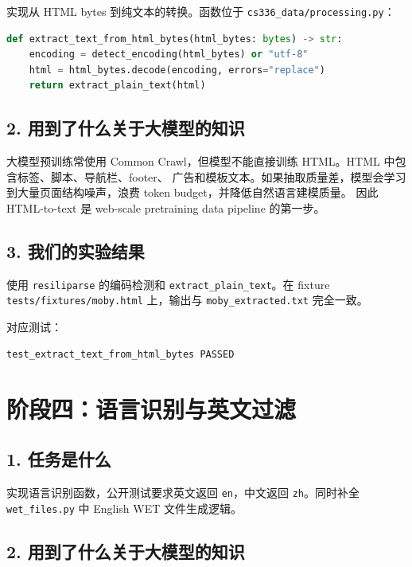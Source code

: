 \documentclass[UTF8,11pt]{ctexart}
\begin{document}
实现从 HTML bytes 到纯文本的转换。函数位于 \texttt{cs336\_data/processing.py}：

\begin{lstlisting}[language=Python]
def extract_text_from_html_bytes(html_bytes: bytes) -> str:
    encoding = detect_encoding(html_bytes) or "utf-8"
    html = html_bytes.decode(encoding, errors="replace")
    return extract_plain_text(html)
\end{lstlisting}

\subsection*{2. 用到了什么关于大模型的知识}

大模型预训练常使用 Common Crawl，但模型不能直接训练 HTML。HTML 中包含标签、脚本、导航栏、footer、
广告和模板文本。如果抽取质量差，模型会学习到大量页面结构噪声，浪费 token budget，并降低自然语言建模质量。
因此 HTML-to-text 是 web-scale pretraining data pipeline 的第一步。

\subsection*{3. 我们的实验结果}

使用 \texttt{resiliparse} 的编码检测和 \texttt{extract\_plain\_text}。在 fixture
\texttt{tests/fixtures/moby.html} 上，输出与 \texttt{moby\_extracted.txt} 完全一致。

对应测试：

\begin{lstlisting}
test_extract_text_from_html_bytes PASSED
\end{lstlisting}

\section{阶段四：语言识别与英文过滤}

\subsection*{1. 任务是什么}

实现语言识别函数，公开测试要求英文返回 \texttt{en}，中文返回 \texttt{zh}。同时补全
\texttt{wet\_files.py} 中 English WET 文件生成逻辑。

\subsection*{2. 用到了什么关于大模型的知识}
\end{document}
